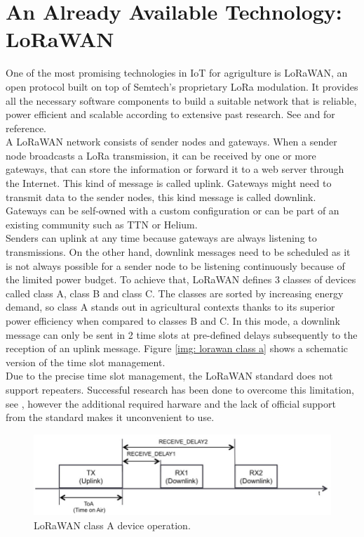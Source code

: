 \section{An Already Available Technology: LoRaWAN}
One of the most promising technologies in \gls{IoT} for agrigulture is \gls{LoRaWAN}, an open protocol built on top of
Semtech's proprietary LoRa modulation. It provides all the necessary software components to build a suitable network
that is reliable, power efficient and scalable according to extensive past research. See \cite{lorawan_agriculture_1}
and \cite{lorawan_agriculture_2} for reference.\\
A LoRaWAN network consists of sender nodes and gateways. When a sender node broadcasts a LoRa transmission, it can be
received by one or more gateways, that can store the information or forward it to a web server through the Internet.
This kind of message is called uplink. Gateways might need to transmit data to the sender nodes, this kind message is
called downlink. Gateways can be self-owned with a custom configuration or can be part of an existing community such as
\gls{TTN} or Helium.\\
Senders can uplink at any time because gateways are always listening to transmissions. On the other hand, downlink
messages need to be scheduled as it is not always possible for a sender node to be listening continuously because of
the limited power budget. To achieve that, LoRaWAN defines 3 classes of devices called class A, class B and class C.
The classes are sorted by increasing energy demand, so class A stands out in agricultural
contexts thanks to its superior power efficiency when compared to classes B and C. In this mode, a downlink message can
only be sent in 2 time slots at pre-defined delays subsequently to the reception of an uplink message. Figure \ref{img:
lorawan class a} shows a schematic version of the time slot management.\\
Due to the precise time slot management, the LoRaWAN standard does not support repeaters. Successful research has been
done to overcome this limitation, see \cite{lorawan_range_extender}, however the additional required harware and the
lack of official support from the standard makes it unconvenient to use.

\begin{figure}[ht]
    \centering
    \includegraphics[width=\linewidth]{images/lorawan_class_a.png}
    \caption{LoRaWAN class A device operation.}
    \label{img: lorawan class a}
\end{figure}

